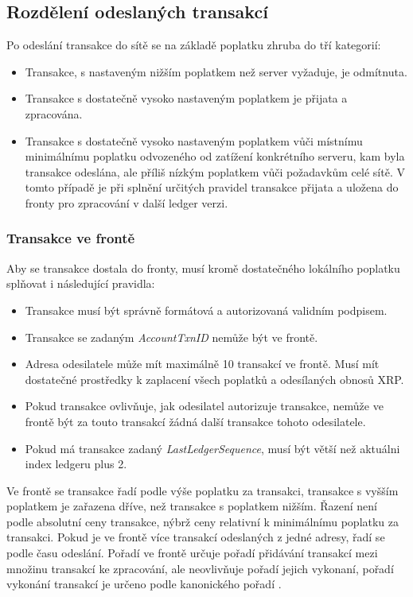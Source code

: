 \documentclass[hidelinks, titlepage]{article}
\begin{document}
\subsection{Rozdělení odeslaných transakcí}
Po odeslání transakce do sítě se na základě poplatku zhruba do tří kategorií:
\begin{itemize}
\item Transakce, s nastaveným nižším poplatkem než server vyžaduje, je odmítnuta.
\item Transakce s dostatečně vysoko nastaveným poplatkem je přijata a zpracována.
\item Transakce s dostatečně vysoko nastaveným poplatkem vůči místnímu minimálnímu poplatku odvozeného od zatížení konkrétního serveru, kam byla transakce odeslána, ale příliš nízkým poplatkem vůči požadavkům celé sítě. V tomto případě je při splnění určitých pravidel transakce přijata a uložena do fronty pro zpracování v další ledger verzi. \cite{fee}
\end{itemize}

\subsubsection{Transakce ve frontě} \label{sec_queue}
Aby se transakce dostala do fronty, musí kromě dostatečného lokálního poplatku splňovat i následující pravidla:
\begin{itemize}
\item Transakce musí být správně formátová a autorizovaná validním podpisem.
\item Transakce se zadaným \textit{AccountTxnID} nemůže být ve frontě.
\item Adresa odesilatele může mít maximálně 10 transakcí ve frontě. Musí mít dostatečné prostředky k zaplacení všech poplatků a odesílaných obnosů XRP.
\item Pokud transakce ovlivňuje, jak odesilatel autorizuje transakce, nemůže ve frontě být za touto transakcí žádná další transakce tohoto odesilatele.
\item Pokud má transakce zadaný \textit{LastLedgerSequence}, musí být větší než aktuálni index ledgeru plus 2.
\end{itemize}

Ve frontě se transakce řadí podle výše poplatku za transakci, transakce s vyšším poplatkem je zařazena dříve, než transakce s poplatkem nižším. Řazení není podle absolutní ceny transakce, nýbrž ceny relativní k minimálnímu poplatku za transakci. Pokud je ve frontě více transakcí odeslaných z jedné adresy, řadí se podle času odeslání. Pořadí ve frontě určuje pořadí přidávání transakcí mezi množinu transakcí ke zpracování, ale neovlivňuje pořadí jejich vykonaní, pořadí vykonání transakcí je určeno podle kanonického pořadí \cite{queue}.
\end{document}
